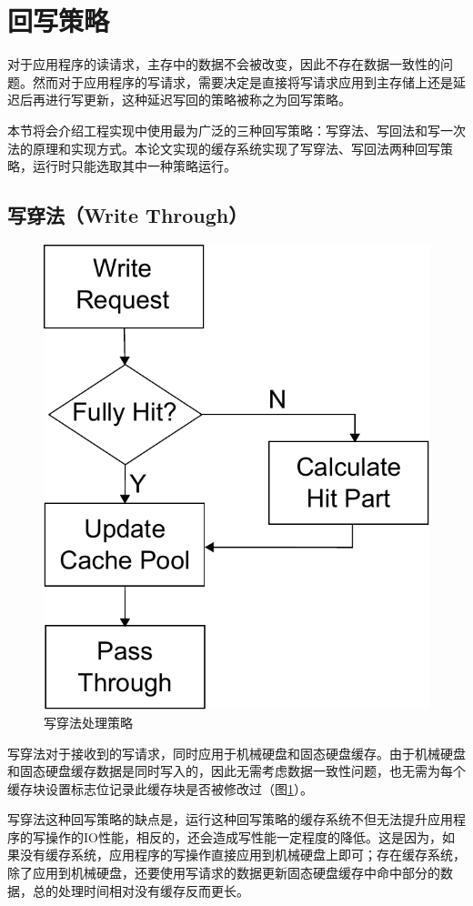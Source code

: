 \section{回写策略}
\label{sec:wb_strategy}

对于应用程序的读请求，主存中的数据不会被改变，因此不存在数据一致性的问题。然而对于应用程序的写请求，需要决定是直接将写请求应用到主存储上还是延迟后再进行写更新，这种延迟写回的策略被称之为回写策略\cite{writeback2014}。

本节将会介绍工程实现中使用最为广泛的三种回写策略：写穿法、写回法和写一次法的原理和实现方式。本论文实现的缓存系统实现了写穿法、写回法两种回写策略，运行时只能选取其中一种策略运行。

\subsection{写穿法（Write Through）}
\begin{figure}[H]
\centering
\includegraphics[width=0.4\linewidth]{./graph/write-through}
\caption{写穿法处理策略}
\label{fig:write-through}
\end{figure}

写穿法\cite{writethrough2010}对于接收到的写请求，同时应用于机械硬盘和固态硬盘缓存。由于机械硬盘和固态硬盘缓存数据是同时写入的，因此无需考虑数据一致性问题，也无需为每个缓存块设置标志位记录此缓存块是否被修改过（图\ref{fig:write-through}）。

写穿法这种回写策略的缺点是，运行这种回写策略的缓存系统不但无法提升应用程序的写操作的IO性能，相反的，还会造成写性能一定程度的降低。这是因为，如果没有缓存系统，应用程序的写操作直接应用到机械硬盘上即可；存在缓存系统，除了应用到机械硬盘，还要使用写请求的数据更新固态硬盘缓存中命中部分的数据，总的处理时间相对没有缓存反而更长。

